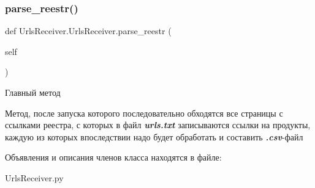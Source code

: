 \subsubsection{\texorpdfstring{parse\+\_\+reestr()}{parse\_reestr()}}
{\footnotesize\ttfamily def Urls\+Receiver.\+Urls\+Receiver.\+parse\+\_\+reestr (\begin{DoxyParamCaption}\item[{}]{self }\end{DoxyParamCaption})}



Главный метод 

Метод, после запуска которого последовательно обходятся все страницы с ссылками реестра, с которых в файл {\itshape {\bfseries urls.\+txt}} записываются ссылки на продукты, каждую из которых впоследствии надо будет обработать и составить {\itshape {\bfseries .csv}}-\/файл 

Объявления и описания членов класса находятся в файле\+:\begin{DoxyCompactItemize}
\item 
Urls\+Receiver.\+py\end{DoxyCompactItemize}
